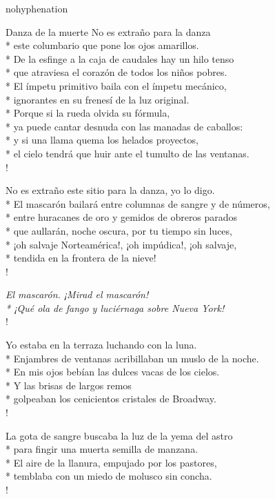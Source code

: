 \documentclass[
    a5paper,
    DIV=10,
    12pt,
    notitlepage,
    oneside,]
{scrbook} %
\begin{document}
\begin{hyphenrules}{nohyphenation}
\begin{poem}{Danza de la muerte}{}{\vspace{-1em}}
No es extraño para la danza\\*
este columbario que pone los ojos amarillos.\\*
De la esfinge a la caja de caudales hay un hilo tenso\\*
que atraviesa el corazón de todos los niños pobres.\\*
El ímpetu primitivo baila con el ímpetu mecánico,\\*
ignorantes en su frenesí de la luz original.\\*
Porque si la rueda olvida su fórmula,\\*
ya puede cantar desnuda con las manadas de caballos:\\*
y si una llama quema los helados proyectos,\\*
el cielo tendrá que huir ante el tumulto de las ventanas.\\!

No es extraño este sitio para la danza, yo lo digo.\\*
El mascarón bailará entre columnas de sangre y de números,\\*
entre huracanes de oro y gemidos de obreros parados\\*
que aullarán, noche oscura, por tu tiempo sin luces,\\*
¡oh salvaje Norteamérica!, ¡oh impúdica!, ¡oh salvaje,\\*
tendida en la frontera de la nieve! \\!

\emph{El mascarón. ¡Mirad el mascarón!\\*
¡Qué ola de fango y luciérnaga sobre Nueva York!} \\!

Yo estaba en la terraza luchando con la luna.\\*
Enjambres de ventanas acribillaban un muslo de la noche.\\*
En mis ojos bebían las dulces vacas de los cielos.\\*
Y las brisas de largos remos\\*
golpeaban los cenicientos cristales de Broadway.\\!

La gota de sangre buscaba la luz de la yema del astro\\*
para fingir una muerta semilla de manzana.\\*
El aire de la llanura, empujado por los pastores,\\*
temblaba con un miedo de molusco sin concha.\\!


\end{poem}
\end{hyphenrules}
\end{document}
